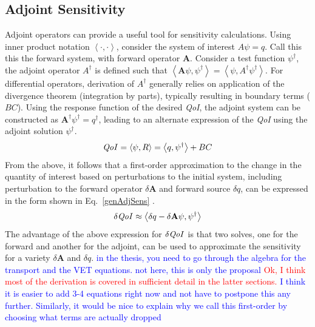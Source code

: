 \documentclass[12pt]{report}
\newcommand{\bra}{\left\langle}
\newcommand{\ket}{\right\rangle}
\newcommand{\qoi}{{\it QoI}\xspace}
\newcommand{\comment}[2]{\marginpar{\textcolor{#2}{$\star$}}\textcolor{#2}{#1}\newline}
\newcommand{\iwh}[1]{\comment{#1}{red}}
\newcommand{\jcr}[1]{\comment{#1}{blue}}
\newcommand{\iwh}[1]{\phantom{a}}
\newcommand{\jcr}[1]{\phantom{a}}
\begin{document}
\subsection{Adjoint Sensitivity}

Adjoint operators can provide a useful tool for sensitivity calculations. Using inner product notation $\bra \cdot , \cdot \ket$, consider the system of interest $A \psi = q$. Call this this the forward system, with forward operator $\mathbf{A}$. Consider a test function $\psi^\dag$, the adjoint operator $A^\dag$ is defined such that $\bra \mathbf{A} \psi, \psi^\dag \ket = \bra \psi, A^\dag \psi^\dag \ket $. For differential operators, derivation of $A^\dag$ generally relies on application of the divergence theorem (integration by parts), typically resulting in boundary terms ($BC$). Using the response function of the desired \qoi, the adjoint system can be constructed as $\mathbf{A^\dag} \psi^\dag = q^\dag$, leading to an alternate expression of the \qoi using the adjoint solution $\psi^\dag $.
\begin{equation}
\label{genAdjQoI}
\qoi = \bra \psi, R \ket = \bra q , \psi^\dag \ket + BC
\end{equation} 
From the above, it follows that a first-order approximation to the change in the quantity of interest based on perturbations to the initial system, including perturbation to the forward operator $\delta \mathbf{A}$ and forward source $\delta q$, can be expressed in the form shown in Eq.~\eqref{genAdjSens} \cite{Marchuk}.
\begin{equation}
\label{genAdjSens}
\delta \qoi \approx \bra \delta q - \delta \mathbf{A} \psi , \psi^\dag \ket 
\end{equation}
The advantage of the above expression for $\delta \qoi$ is that two solves, one for the forward and another for the adjoint, can be used to approximate the sensitivity for a variety $\delta \mathbf{A}$ and $\delta q$.
\jcr{in the thesis, you need to go through the algebra for the transport and the VET equations. not here, this is only the proposal}
\iwh{Ok, I think most of the derivation is covered in sufficient detail in the latter sections.}
\jcr{I think it is easier to add 3-4 equations right now and not have to postpone this any further. Similarly, it would be nice to explain why we call this first-order by choosing what terms are actually dropped}
 
%
%
%
%
\end{document}

